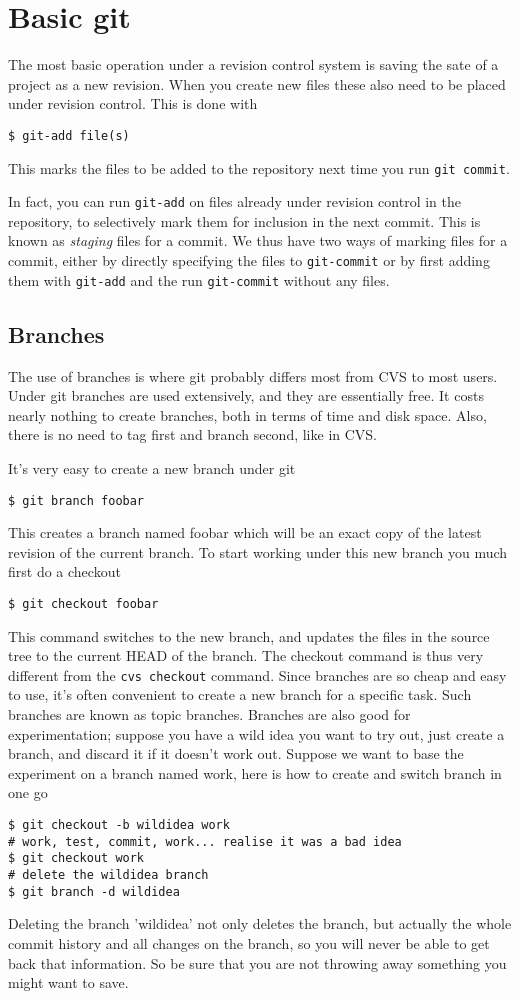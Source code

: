 \documentclass[a4paper,10pt]{article}
\begin{document}
\section{Basic git}
The most basic operation under a revision control system is saving the sate of
a project as a new revision. When you create new files  
these also need to be placed under revision control. This is done with
\begin{verbatim}
$ git-add file(s)
\end{verbatim}
This marks the files to be added to the repository next time you run 
\texttt{git commit}. 

In fact, you can run \texttt{git-add} on files already
under revision control in the repository, to selectively mark them for
inclusion in the next commit. This is known as \emph{staging} files for a
commit. We thus have two ways of marking files for a commit, either by
directly specifying the files to \texttt{git-commit} or by first adding them
with \texttt{git-add} and the run \texttt{git-commit} without any files. 

\subsection{Branches}
The use of branches is where git probably differs most from CVS to most users.
Under git branches are used extensively, and they are essentially
free. It costs nearly nothing to create branches, both in terms of time and
disk space. Also, there is no need to tag first and branch second, like in CVS.

It's very easy to create a new branch under git
\begin{verbatim}
$ git branch foobar
\end{verbatim}
This creates a branch named foobar which will be an exact copy of the latest
revision of the current branch. To start working under this new branch you
much first do a checkout
\begin{verbatim}
$ git checkout foobar
\end{verbatim}
This command switches to the new branch, and updates the files in the source
tree to the current HEAD of the branch. The checkout command is thus very
different from the \texttt{cvs checkout} command.
Since branches are so cheap and easy to use, it's often convenient to create a
new branch for a specific task. Such branches are known as topic branches.
Branches are also good for experimentation; suppose you have a wild idea you
want to try out, just create a branch, and discard it if it doesn't work out.
Suppose we want to base the experiment on a branch named work, here is how to
create and switch branch in one go
\begin{verbatim}
$ git checkout -b wildidea work
# work, test, commit, work... realise it was a bad idea
$ git checkout work
# delete the wildidea branch
$ git branch -d wildidea
\end{verbatim}
Deleting the branch 'wildidea' not only deletes the branch, but actually the
whole commit history and all changes on the branch, so you will never be able
to get back that information. So be sure that you are not throwing away
something you might want to save.
\end{document}
